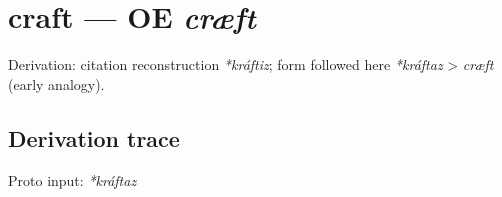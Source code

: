\documentclass[
  british,
  a4paper,
  openany]{book}
\providecommand{\texorpdfstring}[2]{#1}
\begin{document}
\section{\texorpdfstring{craft --- OE
\emph{cræft}}{craft --- OE cræft}}\label{craft-oe-cruxe6ft}


Derivation: citation reconstruction \emph{*kráftiz}; form followed here
\emph{*kráftaz} \textgreater{} \emph{cræft} (early analogy).

\subsection{Derivation trace}\label{derivation-trace-77}

Proto input: \emph{*kráftaz}

\begingroup
\setlength{\fboxsep}{6pt}
\end{document}
